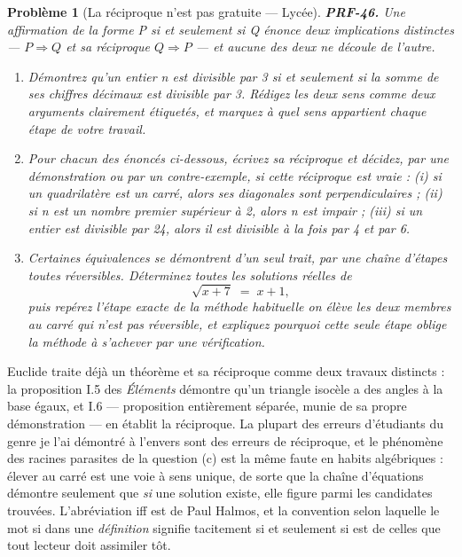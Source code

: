 \documentclass[11pt]{article}
\newtheorem{problem}{Problème}
\begin{document}
\begin{problem}[{La réciproque n'est pas gratuite --- Lycée}]
\textbf{PRF-46.} Une affirmation de la forme \og{} P si et seulement si Q \fg{} énonce deux
implications distinctes --- $ P \Rightarrow Q $ et sa réciproque $ Q \Rightarrow P $ --- et
aucune des deux ne découle de l'autre.
\begin{enumerate}
\item[(a)] Démontrez qu'un entier n est divisible par 3 si et seulement si la somme de ses
chiffres décimaux est divisible par 3. Rédigez les deux sens comme deux arguments
clairement étiquetés, et marquez à quel sens appartient chaque étape de votre travail.
\item[(b)] Pour chacun des énoncés ci-dessous, écrivez sa réciproque et décidez, par une
démonstration ou par un contre-exemple, si cette réciproque est vraie : (i) si un
quadrilatère est un carré, alors ses diagonales sont perpendiculaires ; (ii) si n est un
nombre premier supérieur à 2, alors n est impair ; (iii) si un entier est divisible par 24,
alors il est divisible à la fois par 4 et par 6.
\item[(c)] Certaines équivalences se démontrent d'un seul trait, par une chaîne d'étapes toutes
réversibles. Déterminez toutes les solutions réelles de
\[ \sqrt{x+7} \;=\; x+1, \]
puis repérez l'étape exacte de la méthode habituelle \og{} on élève les deux membres au
carré \fg{} qui n'est \textit{pas} réversible, et expliquez pourquoi cette seule étape oblige la
méthode à s'achever par une vérification.
\end{enumerate}

\end{problem}

\noindent Euclide traite déjà un théorème et sa réciproque comme deux travaux
distincts : la proposition I.5 des \textit{Éléments} démontre qu'un triangle isocèle a des
angles à la base égaux, et I.6 --- proposition entièrement séparée, munie de sa propre
démonstration --- en établit la réciproque. La plupart des erreurs d'étudiants du genre \og{} je
l'ai démontré à l'envers \fg{} sont des erreurs de réciproque, et le phénomène des racines
parasites de la question (c) est la même faute en habits algébriques : élever au carré est
une voie à sens unique, de sorte que la chaîne d'équations démontre seulement que \textit{si}
une solution existe, elle figure parmi les candidates trouvées. L'abréviation \og{} iff \fg{} est de
Paul Halmos, et la convention selon laquelle le mot \og{} si \fg{} dans une \textit{définition}
signifie tacitement \og{} si et seulement si \fg{} est de celles que tout lecteur doit assimiler
tôt.
\end{document}
